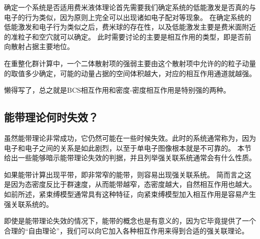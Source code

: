 确定一个系统是否适用费米液体理论首先需要我们确定系统的低能激发是否真的与电子的行为类似，因为原则上完全可以出现诸如电子配对等现象。
在确定系统的低能激发和电子行为类似之后，费米球的存在性，以及低能激发主要是费米面附近的准粒子和空穴就可以确定。
此时需要讨论的主要是相互作用的类型，即是否前向散射占据主要地位。

在重整化群计算中，一个二体散射项的强弱主要由这个散射项中允许的的粒子动量的取值多少确定，可能的动量占据的空间体积越大，对应的相互作用通道就越强。

懒得写了，总之就是BCS相互作用和密度-密度相互作用是特别强的两种。


\subsection{能带理论何时失效？}

虽然能带理论非常成功，它仍然可能在一些时候失效。此时的系统通常称为，因为电子和电子之间的关系是如此剧烈，以至于单电子图像根本就是不可靠的。
本节给出一些能够暗示能带理论失效的判据，并且列举强关联系统通常会有什么性质。

如果能带计算出现平带，即非常窄的能带，则容易出现强关联系统。
简而言之这是因为态密度反比于群速度，从而能带越窄，态密度越大，自然相互作用也越大。
如前所述，紧束缚模型通常具有这种特征，向紧束缚模型加入相互作用是容易产生强关联系统的。

即使是能带理论失效的情况下，能带的概念也是有意义的，因为它毕竟提供了一个合理的“自由理论”，我们可以向它加入各种相互作用来得到合适的强关联理论。
